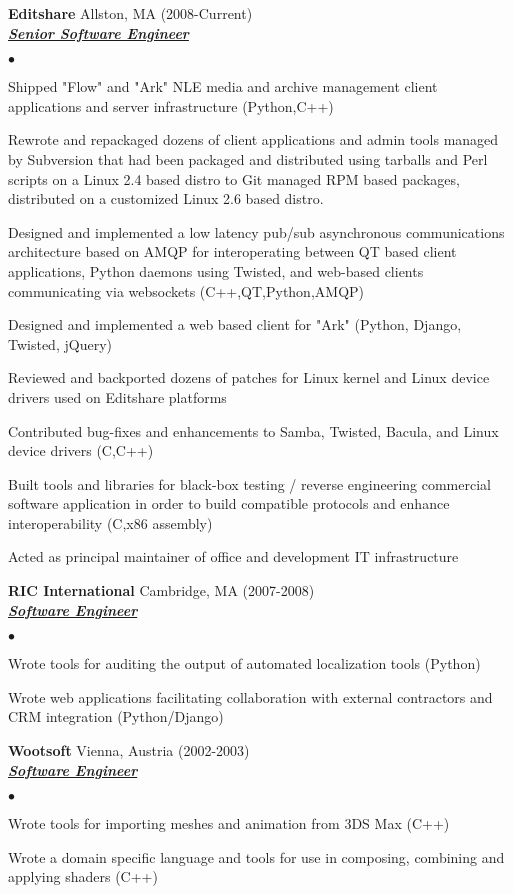 \documentclass{article}
\newcommand{\employer}[4]{{ \textbf{#1} #2 (#3)\\ \underline{\textbf{\emph{#4}}}\\  }}
\newenvironment{achievements}{\begin{list}{$\bullet$}{\topsep 0pt \itemsep -2pt}}{\vspace*{4pt}\end{list}}
\begin{document}
	\employer{Editshare}	{Allston, MA}	{2008-Current}	{Senior Software Engineer}
	\begin{achievements}
	\item Shipped "Flow" and "Ark" NLE media and archive management client applications and server infrastructure (Python,C++)
	\item Rewrote and repackaged dozens of client applications and admin tools managed by Subversion that had been packaged and distributed using tarballs and Perl scripts on a Linux 2.4 based distro to Git managed RPM based packages, distributed on a customized Linux 2.6 based distro.
	\item Designed and implemented a low latency pub/sub asynchronous communications architecture based on AMQP for interoperating between QT based client applications, Python daemons using Twisted, and web-based clients communicating via websockets (C++,QT,Python,AMQP)
	\item Designed and implemented a web based client for "Ark" (Python, Django, Twisted, jQuery)
	\item Reviewed and backported dozens of patches for Linux kernel and Linux device drivers used on Editshare platforms
	\item Contributed bug-fixes and enhancements to Samba, Twisted, Bacula, and Linux device drivers (C,C++)
	\item Built tools and libraries for black-box testing / reverse engineering commercial software application in order to build compatible protocols and enhance interoperability (C,x86 assembly)
	\item Acted as principal maintainer of office and development IT infrastructure
	\end{achievements}

	\employer{RIC International}	{Cambridge, MA}	{2007-2008}	{Software Engineer}
	\begin{achievements}
	\item Wrote tools for auditing the output of automated localization tools (Python)
	\item Wrote web applications facilitating collaboration with external contractors and CRM integration (Python/Django)
	\end{achievements}

	\employer{Wootsoft}		{Vienna, Austria}	{2002-2003}	{Software Engineer}
	\begin{achievements}
	\item Wrote tools for importing meshes and animation from 3DS Max (C++)
	\item Wrote a domain specific language and tools for use in composing, combining and applying shaders (C++)
	\end{achievements}
\end{document}
